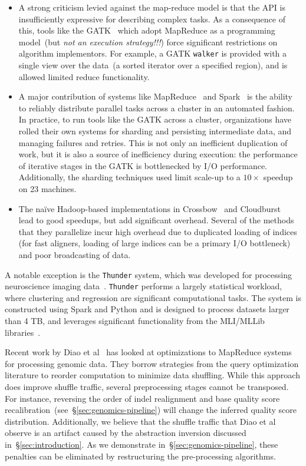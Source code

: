\documentclass{acm_proc_article-sp}
\begin{document}
\begin{itemize}
\item A strong criticism levied against the map-reduce model is that the API is insufficiently expressive
for describing complex tasks. As a consequence of this, tools like the GATK~\cite{mckenna10} which
adopt MapReduce as a programming model~(but \emph{not an execution strategy!!!}) force significant
restrictions on algorithm implementors. For example, a GATK \texttt{walker} is provided with a single
view over the data~(a sorted iterator over a specified region), and is allowed limited reduce functionality.
\item A major contribution of systems like MapReduce~\cite{dean08} and Spark~\cite{zaharia10,
zaharia12} is the ability to reliably distribute parallel tasks across a cluster in an automated fashion. In
practice, to run tools like the GATK across a cluster, organizations have rolled their own systems for
sharding and persisting intermediate data, and managing failures and retries. This is not only an
inefficient duplication of work, but it is also a source of inefficiency during execution: the performance of
iterative stages in the GATK is bottlenecked by I/O performance. Additionally, the sharding techniques
used limit scale-up to a $10\times$ speedup on 23 machines.
\item The na\"{i}ve Hadoop-based implementations in Crossbow~\cite{langmead09} and
Cloudburst~\cite{schatz09} lead to good speedups, but add significant overhead. Several of the
methods that they parallelize incur high overhead due to duplicated loading of indices (for fast aligners,
loading of large indices can be a primary I/O bottleneck) and poor broadcasting of data.
\end{itemize}

A notable exception is the \texttt{Thunder} system, which was developed for processing neuroscience
imaging data~\cite{freeman14}. \texttt{Thunder} performs a largely statistical workload, where clustering
and regression are significant computational tasks. The system is constructed using Spark and Python
and is designed to process datasets larger than 4 TB, and leverages significant functionality from the
MLI/MLLib libraries~\cite{sparks13}.

Recent work by Diao et al~\cite{diao15} has looked at optimizations to MapReduce systems for
processing genomic data. They borrow strategies from the query optimization literature to reorder
computation to minimize data shuffling. While this approach does improve shuffle traffic, several
preprocessing stages cannot be transposed. For instance, reversing the order of indel realignment and
base quality score recalibration~(see~\S\ref{sec:genomics-pipeline}) will change the inferred quality
score distribution. Additionally, we believe that the shuffle traffic that Diao et al observe is an artifact
caused by the abstraction inversion discussed in~\S\ref{sec:introduction}. As we demonstrate
in~\S\ref{sec:genomics-pipeline}, these penalties can be eliminated by restructuring the pre-processing
algorithms.
\end{document}
